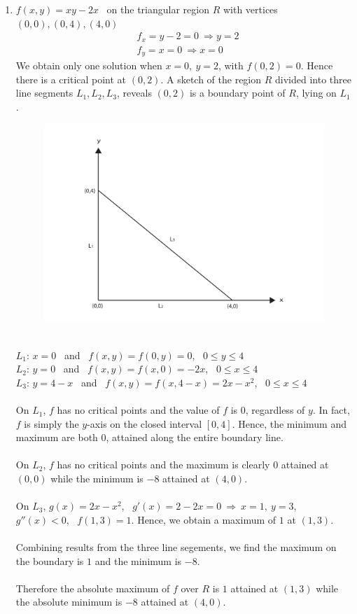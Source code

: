 \documentclass[12pt]{amsart}
\begin{document}
\begin{enumerate}
	\item $f(x,y)=xy-2x$ \ on the triangular region $R$ with vertices $(0,0), (0,4), (4,0)$
		\begin{align*}
			&f_x=y-2=0 \ \Rightarrow y=2 \\
			&f_y=x=0 \ \Rightarrow x=0
		\end{align*} 
		We obtain only one solution when $x=0, \ y=2$, with $f(0,2)=0$. Hence there is a critical point at $(0,2)$. A sketch of the region $R$ divided into three line segments $L_1, L_2, L_3$, reveals $(0,2)$ is a boundary point of $R$, lying on $L_1$. \\
		\begin{figure}[h]
			\centering
			\includegraphics[width=4.4in]{Boundary.pdf}
		\end{figure}
		\\
		$L_1$: $x=0$ \ and \ $f(x,y)=f(0,y)=0$, \ $0\le y \le 4$ \ \\
		$L_2$: $y=0$ \ and \ $f(x,y)=f(x,0)=-2x$, \ $0\le x \le 4$ \  \\
		$L_3$: $y=4-x$ \ and \ $f(x,y)=f(x,4-x)=2x-x^2$, \ $0\le x \le 4$ \\
		\\
		On $L_1$, $f$ has no critical points and the value of $f$ is 0, regardless of $y$. In fact, $f$ is simply the $y$-axis on the closed interval $[0,4]$. Hence, the minimum and maximum are both 0, attained along the entire boundary line. \\
		\\
		On $L_2$, $f$ has no critical points and the maximum is clearly 0 attained at $(0,0)$ while the minimum is $-8$ attained at $(4,0)$. \\
		\\
		On $L_3$, $g(x)=2x-x^2$, \ $g'(x)=2-2x=0 \ \Rightarrow \ x=1, \ y=3$, \ $g''(x)<0$, \ $f(1,3)=1$. Hence, we obtain a maximum of $1$  at $(1,3)$. \\
	 \\
	 Combining results from the three line segements, we find the maximum on the boundary is $1$ and the minimum is $-8$. \\
	 \\
	 Therefore the absolute maximum of $f$ over $R$ is $1$ attained at $(1,3)$ while the absolute minimum is $-8$ attained at $(4,0)$.\\


\end{enumerate}
\end{document}
